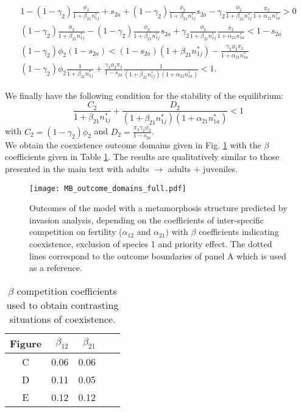\documentclass{article}
\begin{document}
\begin{align*}
    1-(1-\gamma_2)\frac{\phi_2}{1+\beta_{21}n_{1j}^*} + s_{2a}+(1-\gamma_2)\frac{\phi_2}{1+\beta_{21}n_{1j}^*}s_{2a} - \gamma_2\frac{\phi_2}{1+\beta_{21}n_{1j}^*}\frac{\pi_2}{1+\alpha_{21}n_{1a}^*} > 0 \\
    (1-\gamma_2)\frac{\phi_2}{1+\beta_{21}n_{1j}^*} - (1-\gamma_2)\frac{\phi_2}{1+\beta_{21}n_{1j}^*}s_{2a} + \gamma_2\frac{\phi_2}{1+\beta_{21}n_{1j}^*}\frac{\pi_2}{1+\alpha_{21}n_{1a}^*} < 1-s_{2a}\\
    (1-\gamma_2)\phi_2(1-s_{2a}) < (1-s_{2a})(1+\beta_{21}n_{1j}^*)- \frac{\gamma_2\phi_2\pi_2}{1+\alpha_{21}n_{1a}^*}\\
    (1-\gamma_2)\phi_2\frac{1}{1+\beta_{21}n_{1j}^*} + \frac{\gamma_2\phi_2\pi_2}{1-s_{2a}}\frac{1}{(1+\beta_{21}n_{1j}^*)(1+\alpha_{21}n_{1a}^*)} < 1.
\end{align*}

We finally have the following condition for the stability of the equilibrium:
\begin{equation}
    \frac{C_2}{1+\beta_{21}n_{1j}^*}+\frac{D_2}{(1+\beta_{21}n_{1j}^*)(1+\alpha_{21}n_{1a}^*)} < 1
\end{equation}
with $C_2= (1-\gamma_2)\phi_2$ and $D_2= \frac{\pi_2\gamma_2\phi_2}{1-s_{2a}}$.\\

We obtain the coexistence outcome domains given in Fig. \ref{fig:MB_invasion_outcome} with the $\beta$ coefficients given in Table \ref{tab:beta_inv_analysis_MB}. The results are qualitatively similar to those presented in the main text with adults $\rightarrow$ adults + juveniles.

\begin{figure}[H]
    \centering
    \texttt{[image: MB\_outcome\_domains\_full.pdf]}
    \caption{Outcomes of the model with a metamorphosis structure predicted by invasion analysis, depending on the coefficients of inter-specific competition on fertility ($\alpha_{12}$ and $\alpha_{21})$ with $\beta$ coefficients indicating coexistence, exclusion of species 1 and priority effect. The dotted lines correspond to the outcome boundaries of panel A which is used as a reference.}
    \label{fig:MB_invasion_outcome}
\end{figure}

\begin{table}[H]
    \centering
\begin{tabular}{|c|rr|rr|}
  \hline
Figure & $\beta_{12}$ & $\beta_{21}$ \\ 
  \hline
C & 0.06 & 0.06 \\ 
D & 0.11 & 0.05\\ 
E & 0.12 & 0.12\\ 
   \hline
\end{tabular}
\caption{$\beta$ competition coefficients used to obtain contrasting situations of coexistence.}
\label{tab:beta_inv_analysis_MB}
\end{table}
\end{document}
